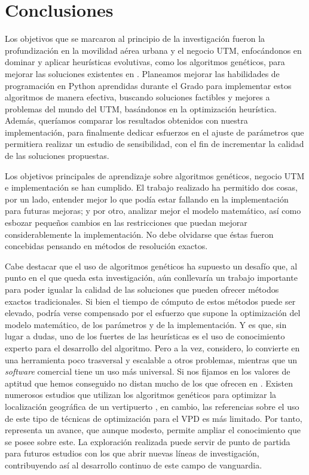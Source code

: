 \documentclass[12pt,a4paper]{book}
\begin{document}
\section{Conclusiones} \label{Subsec: 6_1}
Los objetivos que se marcaron al principio de la investigación fueron la profundización en la movilidad aérea urbana y el negocio UTM, enfocándonos en dominar y aplicar heurísticas evolutivas, como los algoritmos genéticos, para mejorar las soluciones existentes en \cite{park_vertiport_2022}. Planeamos mejorar las habilidades de programación en Python aprendidas durante el Grado para implementar estos algoritmos de manera efectiva, buscando soluciones factibles y mejores a problemas del mundo del UTM, basándonos en la optimización heurística. Además, queríamos comparar los resultados obtenidos con nuestra implementación,  para finalmente dedicar esfuerzos en el ajuste de parámetros que permitiera realizar un estudio de sensibilidad, con el fin de incrementar la calidad de las soluciones propuestas.

Los objetivos principales de aprendizaje sobre algoritmos genéticos, negocio UTM e implementación se han cumplido.  El trabajo realizado ha permitido dos cosas, por un lado, entender mejor lo que podía estar fallando en la implementación para futuras mejoras; y por otro, analizar mejor el modelo matemático, así como esbozar pequeños cambios en las restricciones que puedan mejorar considerablemente la implementación. No debe olvidarse que éstas fueron concebidas pensando en métodos de resolución exactos. 

Cabe destacar que el uso de algoritmos genéticos ha supuesto un desafío que, al punto en el que queda esta investigación, aún conllevaría un trabajo importante para poder igualar la calidad de las soluciones que pueden ofrecer métodos exactos tradicionales. Si bien el tiempo de cómputo de estos métodos puede ser elevado, podría verse compensado por el esfuerzo que supone la optimización del modelo matemático, de los parámetros y de la implementación. Y es que, sin lugar a dudas, uno de los fuertes de las heurísticas es el uso de conocimiento experto para el desarrollo del algoritmo. Pero a la vez, considero, lo convierte en una herramienta poco trasversal y escalable a otros problemas, mientras que un \textsl{software} comercial tiene un uso más universal. Si nos fijamos en los valores de aptitud que hemos conseguido no distan mucho de los que ofrecen en \cite{park_vertiport_2022}. Existen numerosos estudios que utilizan los algoritmos genéticos para optimizar la localización geográfica de un vertipuerto \cite{brunelli_new_2023, shin_skyport_2022}, en cambio, las referencias sobre el uso de este tipo de técnicas de optimización para el VPD es más limitado. Por tanto, representa un avance, que aunque modesto, permite ampliar el conocimiento que se posee sobre este. La exploración realizada puede servir de punto de partida para futuros estudios con los que abrir nuevas líneas de investigación, contribuyendo así al desarrollo continuo de este campo de vanguardia.
\end{document}
